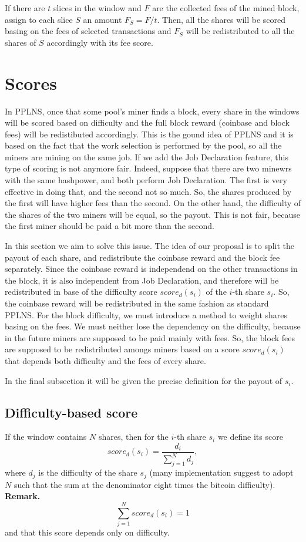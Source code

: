 \documentclass[11pt]{article} %
\begin{document}
If there are $t$ slices in the window and $F$ are the collected fees of the mined block, assign to each slice $S$ an amount $F_S = F/t$. Then, all the shares will be scored basing on the fees of selected transactions and $F_S$ will be redistributed to all the shares of $S$ accordingly with its fee score.

\section{Scores}
In PPLNS, once that some pool's miner finds a block, every share in the windows will be scored based on difficulty and the full block reward (coinbase and block fees) will be redistibuted accordingly. This is the gound idea of PPLNS and it is based on the fact that the work selection is performed by the pool, so all the miners are mining on the same job. If we add the Job Declaration feature, this type of scoring is not anymore fair. Indeed, suppose that there are two minewrs with the same hashpower, and both perform Job Declaration. The first is very effective in doing that, and the second not so much. So, the shares produced by the first will have higher fees than the second. On the other hand, the difficulty of the shares of the two miners will be equal, so the payout. This is not fair, because the first miner should be paid a bit more than the second.

In this section we aim to solve this issue. The idea of our proposal is to split the payout of each share, and redistribute the coinbase reward and the block fee separately. Since the coinbase reward is independend on the other transactions in the block, it is also independent from Job Declaration, and therefore will be redistributed in base of the difficulty score $score_d(s_i)$ of the $i$-th share $s_i$. So, the coinbase reward will be redistributed in the same fashion as standard PPLNS. \newline
For the block difficulty, we must introduce a method to weight shares basing on the fees. We must neither lose the dependency on the difficulty, because in the future miners are supposed to be paid mainly with fees. So, the block fees are supposed to be redistributed amongs miners based on a score $score_d(s_i)$ that depends both difficulty and the fees of every share.

In the final subsection it will be given the precise definition for the payout of $s_i$.

\subsection{Difficulty-based score}
If the window contains $N$ shares, then for the $i$-th share $s_i$ we define its score
\[score_d(s_i) = \frac{d_i}{\sum_{j=1}^Nd_j},\]
where $d_j$ is the difficulty of the share $s_j$ (many implementation suggest to adopt $N$ such that the sum at the denominator eight times the bitcoin difficulty).\newline
\textbf{Remark.} 
\[\sum_{j=1}^N score_d(s_i) = 1\] and that this score depends only on difficulty.
\end{document}
